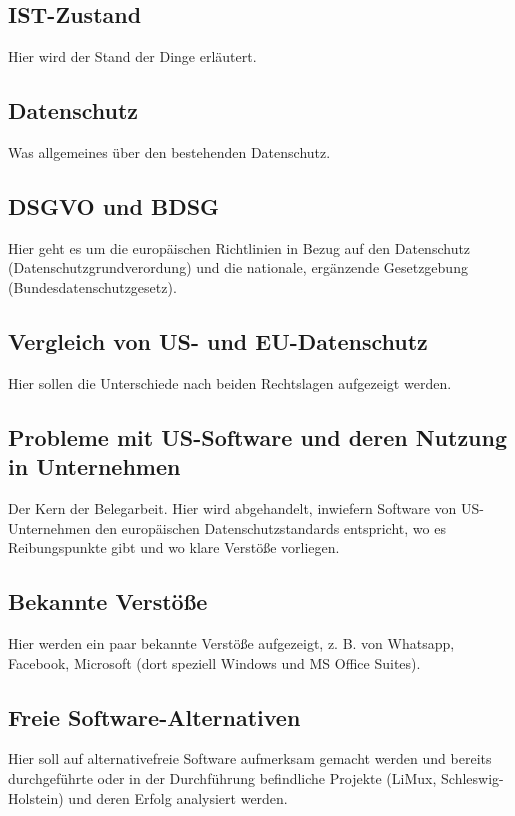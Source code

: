 \subsection{IST-Zustand}
    Hier wird der Stand der Dinge erläutert.

\subsection{Datenschutz}
    Was allgemeines über den bestehenden Datenschutz.

\subsection{DSGVO und BDSG}
    Hier geht es um die europäischen Richtlinien in Bezug auf den Datenschutz (Datenschutzgrundverordung) und die nationale, ergänzende Gesetzgebung (Bundesdatenschutzgesetz).

\subsection{Vergleich von US- und EU-Datenschutz}
    Hier sollen die Unterschiede nach beiden Rechtslagen aufgezeigt werden.

\subsection{Probleme mit US-Software und deren Nutzung in Unternehmen}
    Der Kern der Belegarbeit. Hier wird abgehandelt, inwiefern Software von US-Unternehmen den europäischen Datenschutzstandards entspricht, wo es Reibungspunkte gibt und wo klare Verstöße vorliegen.

\subsection{Bekannte Verstöße}
    Hier werden ein paar bekannte Verstöße aufgezeigt, z. B. von Whatsapp, Facebook, Microsoft (dort speziell Windows und MS Office Suites).

\subsection{Freie Software-Alternativen}
    Hier soll auf alternativefreie Software aufmerksam gemacht werden und bereits durchgeführte oder in der Durchführung befindliche Projekte (LiMux, Schleswig-Holstein) und deren Erfolg analysiert werden.